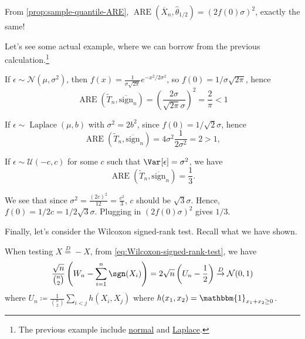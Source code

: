 \begin{prev}
	From \autoref{prop:sample-quantile-ARE}, \(\operatorname{ARE}(\overline{X} _n , \hat{\theta} _{1 / 2}) = (2 f(0) \sigma )^2\), exactly the same!
\end{prev}

Let's see some actual example, where we can borrow from the previous calculation.\footnote{The previous example include \hyperref[eg:ARE-normal]{normal} and \hyperref[eg:ARE-Laplace]{Laplace}.}

\begin{eg}[Gaussian]
	If \(\epsilon \sim \mathcal{N} (\mu , \sigma ^2)\), then \(f(x) = \frac{1}{\sigma \sqrt{2\pi } } e^{- x^2 / 2\sigma ^2}\), so \(f(0) = 1 / \sigma \sqrt{2\pi } \), hence
	\[
		\operatorname{ARE}(\widetilde{T} _n, \overline{\mathrm{sign}} _n)
		= \left( \frac{2\sigma }{\sqrt{2\pi } \sigma } \right) ^2
		= \frac{2}{\pi }
		< 1
	\]
\end{eg}

\begin{eg}[Laplace]
	If \(\epsilon \sim \operatorname{Laplace}(\mu , b) \) with \(\sigma ^2 = 2 b^2\), since \(f(0) = 1 /\sqrt{2} \sigma \), hence
	\[
		\operatorname{ARE}(\widetilde{T} _n, \overline{\mathrm{sign}} _n)
		= 4 \sigma ^2 \frac{1}{2 \sigma ^2}
		= 2
		> 1,
	\]
\end{eg}

\begin{eg}[Uniform]
	If \(\epsilon \sim \mathcal{U} (-c, c)\) for some \(c\) such that \(\Var_{}[\epsilon ] = \sigma ^2\), we have
	\[
		\operatorname{ARE}(\widetilde{T} _n, \overline{\mathrm{sign}} _n)
		= \frac{1}{3}.
	\]
\end{eg}
\begin{explanation}
	We see that since \(\sigma ^2 = \frac{(2c)^2}{12} = \frac{c^2}{3}\), \(c\) should be \(\sqrt{3} \sigma\). Hence, \(f(0) = 1 / 2c = 1 / 2 \sqrt{3} \sigma \). Plugging in \((2 f(0) \sigma )^2\) gives \(1 / 3\).
\end{explanation}

Finally, let's consider the Wilcoxon signed-rank test. Recall what we have shown.

\begin{prev}
	When testing \(X \overset{D}{=} -X\), from \autoref{eq:Wilcoxon-signed-rank-test}, we have
	\[
		\frac{\sqrt{n}}{\binom{n}{2}}  \left( W_n - \sum_{i=1}^{n} \sgn (X_i) \right)
		= 2 \sqrt{n} \left( U_n - \frac{1}{2} \right)
		\overset{D}{\to} \mathcal{N} (0, 1)
	\]
	where \(U_n \coloneqq \frac{1}{\binom{n}{2}} \sum_{i < j} h(X_i, X_j)\) where \(h(x_1, x_2) = \mathbbm{1}_{x_1 + x_2 \geq 0} \).
\end{prev}

